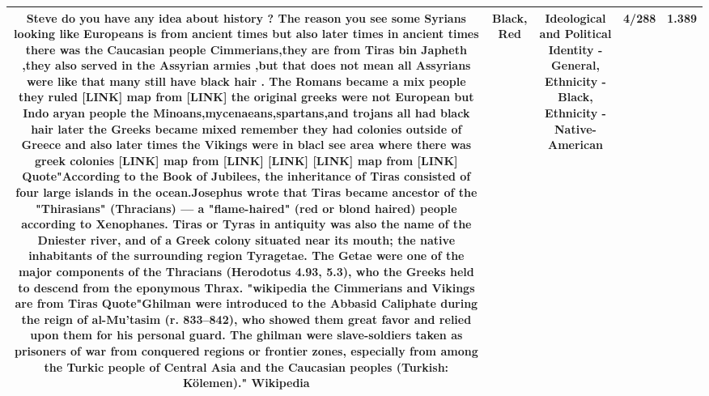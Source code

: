 \documentclass[11pt]{article}
\newlength\mylength
\begin{document}
\begin{center}
\begin{longtable}{|C{.65\mylength}|C{.30\mylength}|C{.12\mylength}|C{.12\mylength}|C{.12\mylength}|}
  \small Steve do you have any idea about history ? The reason you see some Syrians looking like Europeans is from ancient times but also later times in ancient times there was the Caucasian people Cimmerians,they are from Tiras bin Japheth ,they also served in the Assyrian armies ,but that does not mean all Assyrians were like that many still have \textbf{black} hair . The Romans became a mix people they ruled  [LINK]   map from  [LINK] the original greeks were not European but Indo aryan people the Minoans,mycenaeans,spartans,and trojans all had \textbf{black} hair  later the Greeks became mixed  remember they had colonies outside of Greece and also later times the Vikings were in blacl see area where there was greek colonies  [LINK]  map from  [LINK]  [LINK]  [LINK] map from  [LINK] Quote"According to the Book of Jubilees, the inheritance of Tiras consisted of four large islands in the ocean.Josephus wrote that Tiras became ancestor of the "Thirasians" (Thracians) — a "flame-haired" (\textbf{r\textbf{ed}} or blond haired) people according to Xenophanes. Tiras or Tyras in antiquity was also the name of the Dniester river, and of a Greek colony situated near its mouth; the native inhabitants of the surrounding region Tyragetae. The Getae were one of the major components of the Thracians (Herodotus 4.93, 5.3), who the Greeks held to descend from the eponymous Thrax. "wikipedia   the Cimmerians and Vikings are from Tiras Quote"Ghilman were introduced to the Abbasid Caliphate during the reign of al-Mu'tasim (r. 833–842), who showed them great favor and relied upon them for his personal guard. The ghilman were slave-soldiers taken as prisoners of war from conquered regions or frontier zones, especially from among the Turkic people of Central Asia and the Caucasian peoples (Turkish: Kölemen)." Wikipedia\normalsize   & Black, Red &  Ideological and Political Identity - General, Ethnicity - Black, Ethnicity - Native-American & 4/288 & 1.389 \\  \hline

\end{longtable}
\end{center}
\end{document}

